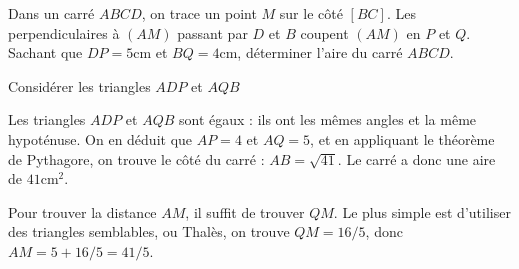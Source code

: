 
\begin{exo}%
Dans un carré $ABCD$, on trace un point $M$ sur le côté $[BC]$.
Les perpendiculaires à $(AM)$ passant par $D$ et $B$ coupent $(AM)$ en $P$ et $Q$.
Sachant que $DP=5$cm et $BQ=4$cm, déterminer l'aire du carré $ABCD$.%
\begin{center}
\end{center}
\begin{hint}
Considérer les triangles $ADP$ et $AQB$
\end{hint}
\begin{sol}
Les triangles $ADP$ et $AQB$ sont égaux : ils ont les mêmes angles et la même hypoténuse.
On en déduit que $AP=4$ et $AQ=5$, et en appliquant le théorème de Pythagore, on trouve le côté du carré : $AB=\sqrt{41}$.
Le carré a donc une aire de $41\mathrm{cm}^2$.

Pour trouver la distance $AM$, il suffit de trouver $QM$. Le plus simple est d'utiliser des triangles semblables, ou Thalès, on trouve $QM=16/5$, donc $AM=5+16/5=41/5$.
\end{sol}
\end{exo}





